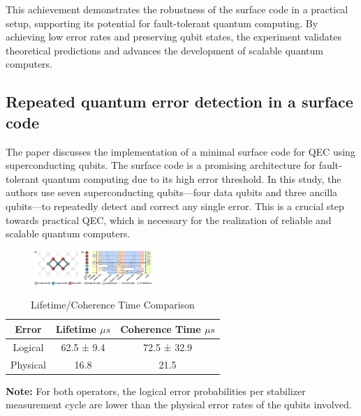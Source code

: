 This achievement demonstrates the robustness of the surface code in a practical setup, supporting its potential for fault-tolerant quantum computing. By achieving low error rates and preserving qubit states, the experiment validates theoretical predictions and advances the development of scalable quantum computers.

\subsection{Repeated quantum error detection in a surface code}

The paper discusses the implementation of a minimal surface code for QEC using superconducting qubits. The surface code is a promising architecture for fault-tolerant quantum computing due to its high error threshold. In this study, the authors use seven superconducting qubits—four data qubits and three ancilla qubits—to repeatedly detect and correct any single error. This is a crucial step towards practical QEC, which is necessary for the realization of reliable and scalable quantum computers.

\begin{figure}[h]
    \centering
    \includegraphics[width=0.4\textwidth]{sections/5_practical_implementation/7_qubits.jpg}
    \caption{}
\end{figure}

\begin{table}[h]
    \centering
    \caption{Lifetime/Coherence Time Comparison}
    \begin{center}
        \begin{tabular}{|c|c|c|}
            \hline
            \textbf{Error} & \textbf{Lifetime $\mu s$} & \textbf{Coherence Time $\mu s$} \\
            \hline
            Logical        & 62.5 ± 9.4                & 72.5 ± 32.9 \\
            Physical       & 16.8                      & 21.5        \\
            \hline
        \end{tabular}
    \end{center}
    \begin{tablenotes}
        \small
        \item \textbf{Note:} For both operators, the logical error probabilities per stabilizer measurement cycle are lower than the physical error rates of the qubits involved.
    \end{tablenotes}
\end{table}


